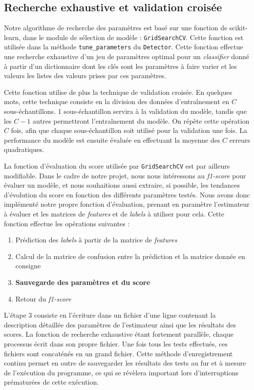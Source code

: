\documentclass[a4paper]{report}
\begin{document}
\subsection{Recherche exhaustive et validation croisée}

Notre algorithme de recherche des paramètres est basé sur une fonction de scikit-learn, dans le module de sélection de modèle : \texttt{GridSearchCV}. Cette fonction est utilisée dans la méthode \texttt{tune\_parameters} du \texttt{Detector}. Cette fonction effectue une recherche exhaustive d'un jeu de paramètres optimal pour un \emph{classifier} donné à partir d'un dictionnaire dont les clés sont les paramètres à faire varier et les valeurs les listes des valeurs prises par ces paramètres.

Cette fonction utilise de plus la technique de validation croisée. En quelques mots, cette technique consiste en la division des données d'entraînement en $C$ sous-échantillons. 1 sous-échantillon servira à la validation du modèle, tandis que les $C-1$ autres permettront l'entraînement du modèle. On répète cette opération $C$ fois, afin que chaque sous-échantillon soit utilisé pour la validation une fois. La performance du modèle est ensuite évaluée en effectuant la moyenne des $C$ erreurs quadratiques.

La fonction d'évaluation du score utilisée par \texttt{GridSearchCV} est par ailleurs modifiable. Dans le cadre de notre projet, nous nous intéressons au \emph{f1-score} pour évaluer un modèle, et nous souhaitions aussi extraire, si possible, les tendances d'évolution du score en fonction des différents paramètres testés. Nous avons donc implémenté notre propre fonction d'évaluation, prenant en paramètre l'estimateur à évaluer et les matrices de \emph{features} et de \emph{labels} à utiliser pour cela. Cette fonction effectue les opérations suivantes :

\begin{enumerate}
\item Prédiction des \emph{labels} à partir de la matrice de \emph{features}
\item Calcul de la matrice de confusion entre la prédiction et la matrice donnée en consigne
\item \textbf{Sauvegarde des paramètres et du score}
\item Retour du \emph{f1-score}
\end{enumerate}

L'étape 3 consiste en l'écriture dans un fichier d'une ligne contenant la description détaillée des paramètres de l'estimateur ainsi que les résultats des scores. La fonction de recherche exhaustive étant fortement parallèle, chaque processus écrit dans son propre fichier. Une fois tous les tests effectués, ces fichiers sont concaténés en un grand fichier. Cette méthode d'enregistrement continu permet en outre de sauvegarder les résultats des tests au fur et à mesure de l'exécution du programme, ce qui se révèlera important lors d'interruptions prématurées de cette exécution.
\end{document}
